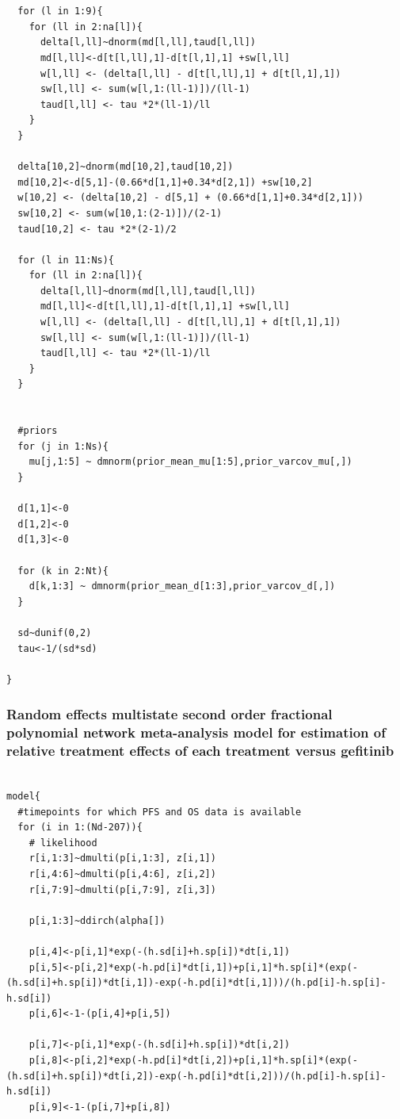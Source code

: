 \documentclass[11pt,final,fleqn]{article}\usepackage[]{graphicx}\usepackage[]{color}
\theoremstyle{plain}
\begin{document}
\begin{appendices}
\begin{verbatim}
  

  for (l in 1:9){
    for (ll in 2:na[l]){
      delta[l,ll]~dnorm(md[l,ll],taud[l,ll])
      md[l,ll]<-d[t[l,ll],1]-d[t[l,1],1] +sw[l,ll]
      w[l,ll] <- (delta[l,ll] - d[t[l,ll],1] + d[t[l,1],1])
      sw[l,ll] <- sum(w[l,1:(ll-1)])/(ll-1) 
      taud[l,ll] <- tau *2*(ll-1)/ll 
    }
  }
  
  delta[10,2]~dnorm(md[10,2],taud[10,2])
  md[10,2]<-d[5,1]-(0.66*d[1,1]+0.34*d[2,1]) +sw[10,2]
  w[10,2] <- (delta[10,2] - d[5,1] + (0.66*d[1,1]+0.34*d[2,1]))
  sw[10,2] <- sum(w[10,1:(2-1)])/(2-1) 
  taud[10,2] <- tau *2*(2-1)/2 
  
  for (l in 11:Ns){
    for (ll in 2:na[l]){
      delta[l,ll]~dnorm(md[l,ll],taud[l,ll])
      md[l,ll]<-d[t[l,ll],1]-d[t[l,1],1] +sw[l,ll]
      w[l,ll] <- (delta[l,ll] - d[t[l,ll],1] + d[t[l,1],1])
      sw[l,ll] <- sum(w[l,1:(ll-1)])/(ll-1) 
      taud[l,ll] <- tau *2*(ll-1)/ll 
    }
  }
  
  
  #priors
  for (j in 1:Ns){
    mu[j,1:5] ~ dmnorm(prior_mean_mu[1:5],prior_varcov_mu[,]) 
  }
  
  d[1,1]<-0
  d[1,2]<-0
  d[1,3]<-0

  for (k in 2:Nt){
    d[k,1:3] ~ dmnorm(prior_mean_d[1:3],prior_varcov_d[,]) 
  }
  
  sd~dunif(0,2)
  tau<-1/(sd*sd)
  
}

\end{verbatim}

\subsubsection{Random effects multistate second order fractional polynomial network meta-analysis model for estimation of relative treatment effects of each treatment versus gefitinib}
\begin{verbatim} 

model{
  #timepoints for which PFS and OS data is available
  for (i in 1:(Nd-207)){
    # likelihood
    r[i,1:3]~dmulti(p[i,1:3], z[i,1]) 
    r[i,4:6]~dmulti(p[i,4:6], z[i,2]) 
    r[i,7:9]~dmulti(p[i,7:9], z[i,3]) 
    
    p[i,1:3]~ddirch(alpha[])
    
    p[i,4]<-p[i,1]*exp(-(h.sd[i]+h.sp[i])*dt[i,1])
    p[i,5]<-p[i,2]*exp(-h.pd[i]*dt[i,1])+p[i,1]*h.sp[i]*(exp(-(h.sd[i]+h.sp[i])*dt[i,1])-exp(-h.pd[i]*dt[i,1]))/(h.pd[i]-h.sp[i]-h.sd[i])
    p[i,6]<-1-(p[i,4]+p[i,5])
    
    p[i,7]<-p[i,1]*exp(-(h.sd[i]+h.sp[i])*dt[i,2])
    p[i,8]<-p[i,2]*exp(-h.pd[i]*dt[i,2])+p[i,1]*h.sp[i]*(exp(-(h.sd[i]+h.sp[i])*dt[i,2])-exp(-h.pd[i]*dt[i,2]))/(h.pd[i]-h.sp[i]-h.sd[i])
    p[i,9]<-1-(p[i,7]+p[i,8])
    

\end{verbatim}
\end{appendices}
\end{document}
